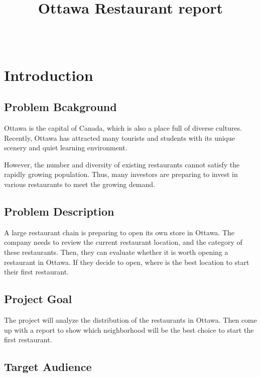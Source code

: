 \documentclass[14pt, conference, onecolumn]{IEEEtran}
\begin{document}
\title{Ottawa Restaurant report}

\author{\\
}


\maketitle

\section{Introduction}
\subsection{Problem Bcakground}

Ottawa is the capital of Canada, which is also a place full of diverse cultures. Recently, Ottawa has attracted many tourists and students with its unique scenery and quiet learning environment. 

However, the number and diversity of existing restaurants cannot satisfy the rapidly growing population. Thus, many investors are preparing to invest in various restaurants to meet the growing demand.

\subsection{Problem Description}

A large restaurant chain is preparing to open its own store in Ottawa. The company needs to review the current restaurant location, and the category of these restaurants. Then, they can evaluate whether it is worth opening a restaurant in Ottawa. If they decide to open, where is the best location to start their first restaurant.

\subsection{Project Goal}

The project will analyze the distribution of the restaurants in Ottawa. Then come up with a report to show which neighborhood will be the best choice to start the first restaurant.

\subsection{Target Audience}
\end{document}
